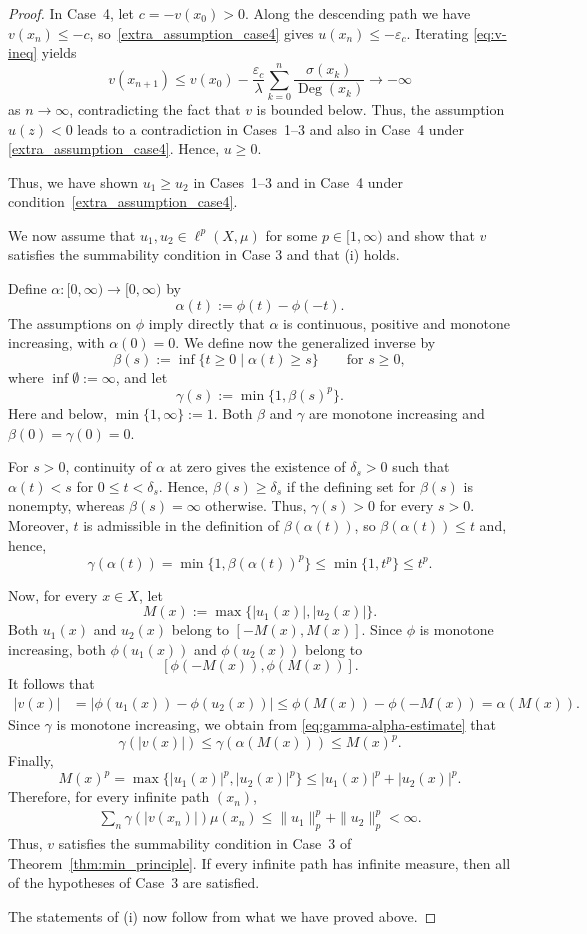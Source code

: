 \documentclass[10pt,a4paper]{amsart}
\newcommand{\Deg}{\operatorname{Deg}}
\begin{document}
\begin{proof}
{In Case~4, let $c=-v(x_0)>0$. Along the descending path we have
$v(x_n)\leq-c$, so~\eqref{extra_assumption_case4} gives
$u(x_n)\leq-\varepsilon_c$. Iterating
\eqref{eq:v-ineq} yields
\[
 v(x_{n+1})
 \leq v(x_0)-\frac{\varepsilon_c}{\lambda}
 \sum_{k=0}^n\frac{\sigma(x_k)}{\Deg(x_k)}
 \to -\infty
\]
as $n \to \infty$, contradicting the fact that $v$ is bounded below.
Thus, the assumption $u(z)<0$ leads to a contradiction in Cases~1--3
and also in Case~4 under \eqref{extra_assumption_case4}. Hence, $u\geq0$.
}
{ Thus, we have shown $u_1\geq u_2$ in Cases~1--3 and in
Case~4 under condition~\eqref{extra_assumption_case4}.

We now assume that $u_1,u_2 \in \ell^p(X,\mu)$ for some $p \in [1,\infty)$
and show that $v$ satisfies the summability condition in Case 3 and that (i) holds.}
{
Define $\alpha\colon[0,\infty)\to[0,\infty)$ by
\[
 \alpha(t):=\phi(t)-\phi(-t).
\]
The assumptions on $\phi$ imply directly that $\alpha$ is continuous,
positive and monotone increasing, with $\alpha(0)=0$.
We define now the generalized  inverse by
\[
 \beta(s):=\inf\{t\geq0 \mid \alpha(t)\geq s\}
 \qquad \text{for } s\geq0,
\]
where $\inf\emptyset:=\infty$, and let
\[
 \gamma(s):=\min\{1,\beta(s)^p\}.
\]
Here and below, $\min\{1,\infty\}:=1$. Both $\beta$ and $\gamma$ are
monotone increasing and $\beta(0)=\gamma(0)=0$.

For $s>0$, continuity of $\alpha$ at zero gives the existence of $\delta_s>0$ such that
$\alpha(t)<s$ for $0\leq t<\delta_s$. Hence, $\beta(s)\geq\delta_s$ if
the defining set for $\beta(s)$ is nonempty, whereas $\beta(s)=\infty$
otherwise. Thus, $\gamma(s)>0$ for every $s>0$. Moreover, $t$ is
admissible in the definition of $\beta(\alpha(t))$, so
$\beta(\alpha(t))\leq t$ and, hence,
\begin{equation}\label{eq:gamma-alpha-estimate}
 \gamma(\alpha(t))
 =
 \min\{1,\beta(\alpha(t))^p\}
 \leq\min\{1,t^p\}
 \leq t^p.
\end{equation}

Now, for every $x\in X$, let
\[
 M(x):=\max\{|u_1(x)|,|u_2(x)|\}.
\]
Both $u_1(x)$ and $u_2(x)$ belong to $[-M(x),M(x)]$. Since $\phi$ is
monotone increasing, both $\phi(u_1(x))$ and $\phi(u_2(x))$ belong to
\[
 [\phi(-M(x)),\phi(M(x))].
\]
It follows that
\begin{align*}
 |v(x)|
 &=
 |\phi(u_1(x))-\phi(u_2(x))|\leq
 \phi(M(x))-\phi(-M(x))
 =
 \alpha(M(x)).
\end{align*}
Since $\gamma$ is monotone increasing, we obtain from
\eqref{eq:gamma-alpha-estimate} that
\[
 \gamma(|v(x)|)
 \leq
 \gamma(\alpha(M(x)))
 \leq
 M(x)^p.
\]
Finally,
\[
 M(x)^p
 =
 \max\{|u_1(x)|^p,|u_2(x)|^p\}
 \leq
 |u_1(x)|^p+|u_2(x)|^p.
\]
Therefore, for every infinite path $(x_n)$,
\begin{align*}
 \sum_n\gamma(|v(x_n)|)\mu(x_n)
 \leq
 \|u_1\|_p^p+\|u_2\|_p^p
 <\infty.
\end{align*}
Thus, $v$ satisfies the summability condition in Case~3 of
Theorem~\ref{thm:min_principle}. If every infinite path has infinite
measure, then all of the hypotheses of Case~3 are satisfied.
{ The statements of (i) now follow from what we have proved above.

}}
\end{proof}
\end{document}
